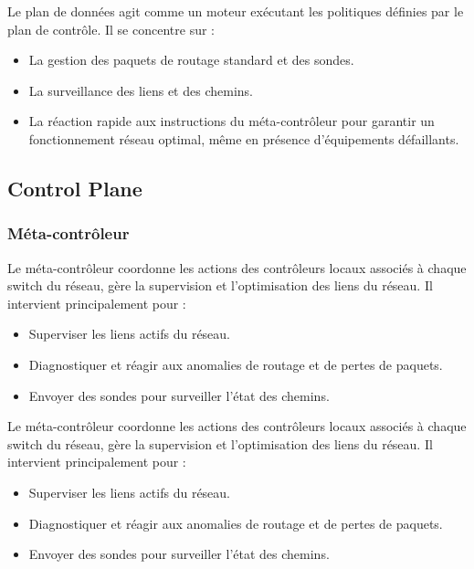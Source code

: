\documentclass[12pt,a4paper]{report}
\begin{document}
        \begin{card}
        Le plan de données agit comme un moteur exécutant les politiques définies par le plan de contrôle. Il se concentre sur :
        \begin{itemize}[left=0pt]
            \item La gestion des paquets de routage standard et des sondes.
            \item La surveillance des liens et des chemins.
            \item La réaction rapide aux instructions du méta-contrôleur pour garantir un fonctionnement réseau optimal, même en présence d'équipements défaillants.
        \end{itemize}
        \end{card}

    \subsection{Control Plane}

        \subsubsection{Méta-contrôleur}

        \begin{card}
            Le méta-contrôleur coordonne les actions des contrôleurs locaux associés à chaque switch du réseau, gère la supervision et l'optimisation des liens du réseau. Il intervient principalement pour :
            \begin{itemize}[left=0pt]
                \item Superviser les liens actifs du réseau.
                \item Diagnostiquer et réagir aux anomalies de routage et de pertes de paquets.
                \item Envoyer des sondes pour surveiller l'état des chemins.
            \end{itemize}
        \end{card}

        \begin{card}
            Le méta-contrôleur coordonne les actions des contrôleurs locaux associés à chaque switch du réseau, gère la supervision et l'optimisation des liens du réseau. Il intervient principalement pour :
            \begin{itemize}
                \item Superviser les liens actifs du réseau.
                \item Diagnostiquer et réagir aux anomalies de routage et de pertes de paquets.
                \item Envoyer des sondes pour surveiller l'état des chemins.
            \end{itemize}
        \end{card}
\end{document}
